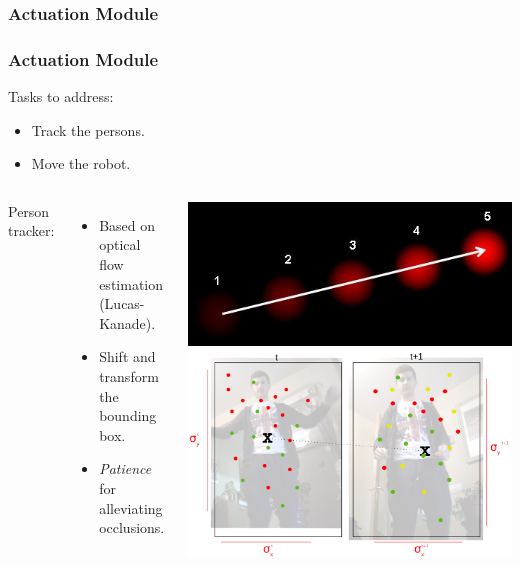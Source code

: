 \documentclass[11pt]{beamer}
\begin{document}
\subsubsection{Actuation Module}
\begin{frame}[allowframebreaks]
	\frametitle{Actuation Module}
	Tasks to address:
	\begin{itemize}
		\item Track the persons.
		\item Move the robot.
	\end{itemize}
	\vspace{10cm}
	\begin{columns}
		Person tracker:
		\vspace{0.5cm}
		\begin{itemize}
			\item Based on optical flow estimation (Lucas-Kanade).
			\item Shift and transform the bounding box.
			\item \textit{Patience} for alleviating occlusions.
		\end{itemize}
			\begin{center}
				\includegraphics[width=0.6\linewidth]{optical_flow}
				\includegraphics[width=\linewidth]{tracker_update}
			\end{center}

\end{columns}
\end{frame}
\end{document}
